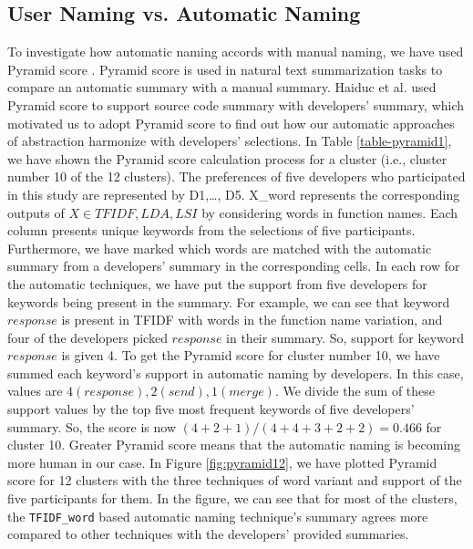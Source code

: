 \subsection{User Naming vs. Automatic Naming}
To investigate how automatic naming accords with manual naming, we have used Pyramid score \cite{nenkova2004evaluating}. Pyramid score is used in natural text summarization tasks to compare an automatic summary with a manual summary. Haiduc et al. \cite{haiduc2010supporting}  used Pyramid score to support source code summary with developers' summary, which motivated us to adopt Pyramid score to find out how our automatic approaches of abstraction harmonize with developers' selections. In Table \ref{table-pyramid1}, we have shown the Pyramid score calculation process for a cluster (i.e., cluster number 10 of the 12 clusters). The preferences of five developers who participated in this study are represented by D1,\ldots, D5. X\_word represents the corresponding outputs of $X \in {TFIDF, LDA, LSI }$ by considering words in function names. Each column presents unique keywords from the selections of five participants. Furthermore, we have marked which words are matched with the automatic summary from a developers' summary in the corresponding cells. In each row for the automatic techniques, we have put the support from five developers for keywords being present in the summary. For example, we can see that keyword $response$ is present in TFIDF with words in the function name variation, and four of the developers picked $response$ in their summary. So, support for keyword $response$ is given 4. To get the Pyramid score for cluster number 10, we have summed each keyword's support in automatic naming by developers. In this case, values are $4(response), 2(send), 1(merge)$. We divide the sum of these support values by the top five most frequent keywords of five developers' summary. So, the score is now $(4+2+1)/(4+4+3+2+2) = 0.466 $ for cluster 10. Greater Pyramid score means that the automatic naming is becoming more human in our case. In Figure \ref{fig:pyramid12}, we have plotted Pyramid score for 12 clusters with the three techniques of word variant and support of the five participants for them. In the figure, we can see that for most of the clusters, the \texttt{TFIDF\_word} based automatic naming technique's summary agrees more compared to other techniques with  the developers' provided summaries.

